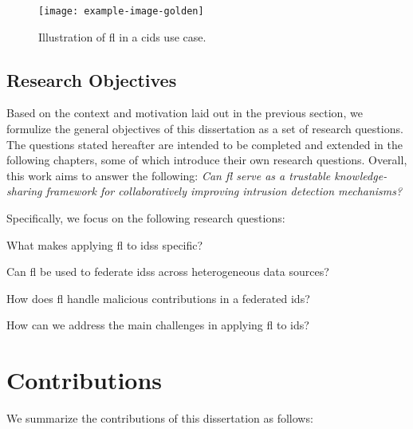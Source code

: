 \begin{figure}
  \centering
  \texttt{[image: example-image-golden]}
  \caption{Illustration of \gls{fl} in a \gls{cids} use case.}
  \label{fig:intro.usecase}
\end{figure}

\subsection{Research Objectives\label{sec:intro.questions}}

Based on the context and motivation laid out in the previous section, we formulize the general objectives of this dissertation as a set of research questions.
The questions stated hereafter are intended to be completed and extended in the following chapters, some of which introduce their own research questions.
Overall, this work aims to answer the following: \emph{Can \gls{fl} serve as a trustable knowledge-sharing framework for collaboratively improving intrusion detection mechanisms?}

Specifically, we focus on the following research questions:

\begin{questions}
  \item What makes applying \gls{fl} to \glspl{ids} specific? \label{rq:intro.fids}
  \item Can \gls{fl} be used to federate \glspl{ids} across heterogeneous data sources? \label{rq:intro.heterogeneity}
  \item How does \gls{fl} handle malicious contributions in a federated \gls{ids}? \label{rq:intro.malicious}
  \item How can we address the main challenges in applying \gls{fl} to \gls{ids}? \label{rq:intro.propositions}
\end{questions}


\section{Contributions\label{sec:intro.contributions}}

We summarize the contributions of this dissertation as follows:

